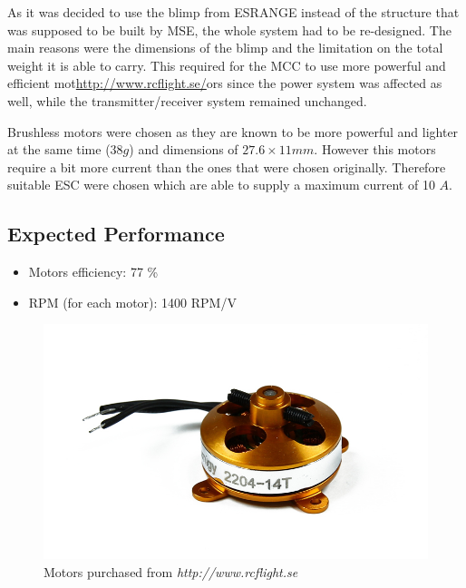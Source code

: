 As it was decided to use the blimp from ESRANGE instead of the structure that was supposed to be built by MSE, the whole system had to be re-designed. The main reasons were the dimensions of the blimp and the limitation on the total weight it is able to carry. This required for the MCC to use more powerful and efficient mot\url{http://www.rcflight.se/}ors since the power system was affected as well, while the transmitter/receiver system remained unchanged.

Brushless motors were chosen as they are known to be more powerful and lighter at the same time ($38g$) and dimensions of $27.6 \times 11 mm$. However this motors require a bit more current than the ones that were chosen originally. Therefore suitable ESC were chosen which are able to supply a maximum current of 10 $A$. 



\subsection{Expected Performance}

\begin{itemize}
\item Motors efficiency: 77 \% 
\item RPM (for each motor): 1400 RPM/V
\end{itemize}

\begin{figure}[bht]
\centering
\includegraphics[scale=0.4]{figures/Motors.jpg}
\caption{Motors purchased from \textit{http://www.rcflight.se}}
\label{fig:Motors}
\end{figure}

